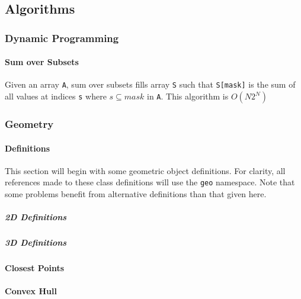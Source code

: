\documentclass[letterpaper,11pt,twoside]{article}
\newcommand{\PartDivider}[1] {
    \clearpage
    \thispagestyle{empty}
    \vspace*{\stretch{2}}
    \begin{center}
        \part{#1}
    \end{center}
    \vspace*{\stretch{4}}
    \clearpage
}
\begin{document}
    \PartDivider{Algorithms}
        \section{Dynamic Programming}
            \subsection{Sum over Subsets}
                Given an array \verb|A|, sum over subsets fills array \verb|S| such that \verb|S[mask]| is the sum of all values at indices \verb|s| where $s \subseteq mask$ in \verb|A|.
                This algorithm is $O(N2^{N})$
                
                

        \section{Geometry}
            \subsection{Definitions}
            This section will begin with some geometric object definitions.
            For clarity, all references made to these class definitions will use the \verb|geo| namespace.
            Note that some problems benefit from alternative definitions than that given here.

            \subsubsection{2D Definitions}
                
                

            \subsubsection{3D Definitions}
                

            \subsection{Closest Points}
            \subsection{Convex Hull}
                
\end{document}

